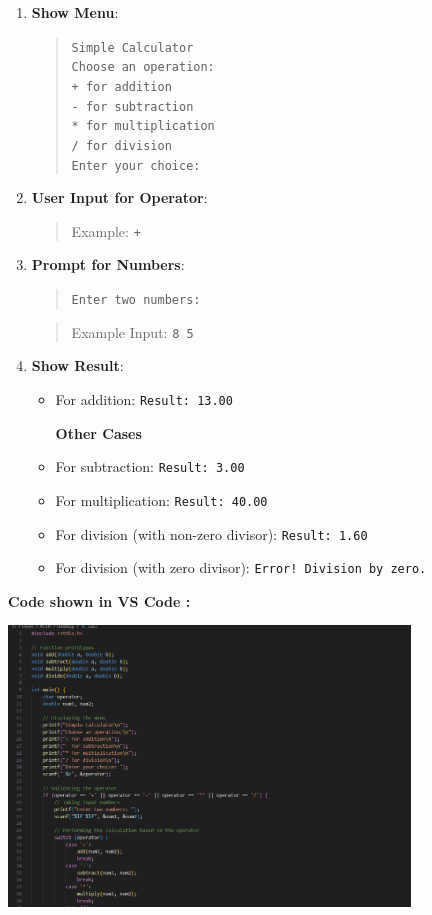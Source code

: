 \documentclass[a4paper,12pt]{article}
\begin{document}
\begin{enumerate}
    \item \textbf{Show Menu}:
    \begin{quote}
        \texttt{Simple Calculator} \\
        \texttt{Choose an operation:} \\
        \texttt{+ for addition} \\
        \texttt{- for subtraction} \\
        \texttt{* for multiplication} \\
        \texttt{/ for division} \\
        \texttt{Enter your choice:}
    \end{quote}
    \item \textbf{User Input for Operator}:
    \begin{quote}
        Example: \texttt{+}
    \end{quote}
    \item \textbf{Prompt for Numbers}:
    \begin{quote}
        \texttt{Enter two numbers:}
    \end{quote}
    \begin{quote}
        Example Input: \texttt{8 5}
    \end{quote}
    \item \textbf{Show Result}:
    \begin{itemize}
        \item For addition: \texttt{Result: 13.00}
        \par\vspace{2em} \textbf{Other Cases} \par\vspace{1em}
        \item For subtraction: \texttt{Result: 3.00}
        \item For multiplication: \texttt{Result: 40.00}
        \item For division (with non-zero divisor): \texttt{Result: 1.60}
        \item For division (with zero divisor): \texttt{Error! Division by zero.}
    \end{itemize}
\end{enumerate}
\par\vspace{5em}
\large\textbf{Code shown in VS Code :}
\par\vspace{2em}
\includegraphics[width=0.8\textwidth]{srija.png}
\end{document}
